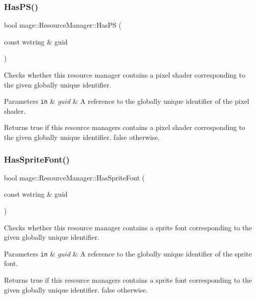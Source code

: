 \subsubsection{\texorpdfstring{Has\+P\+S()}{HasPS()}}
{\footnotesize\ttfamily bool mage\+::\+Resource\+Manager\+::\+Has\+PS (\begin{DoxyParamCaption}\item[{const wstring \&}]{guid }\end{DoxyParamCaption})\hspace{0.3cm}{\ttfamily [noexcept]}}

Checks whether this resource manager contains a pixel shader corresponding to the given globally unique identifier.


\begin{DoxyParams}[1]{Parameters}
\mbox{\tt in}  & {\em guid} & A reference to the globally unique identifier of the pixel shader. \\
\hline
\end{DoxyParams}
\begin{DoxyReturn}{Returns}
{\ttfamily true} if this resource managers contains a pixel shader corresponding to the given globally unique identifier. {\ttfamily false} otherwise. 
\end{DoxyReturn}
\hypertarget{classmage_1_1_resource_manager_a505a5b25923d88020d85a2f3307e4b7f}{}\label{classmage_1_1_resource_manager_a505a5b25923d88020d85a2f3307e4b7f} 
\subsubsection{\texorpdfstring{Has\+Sprite\+Font()}{HasSpriteFont()}}
{\footnotesize\ttfamily bool mage\+::\+Resource\+Manager\+::\+Has\+Sprite\+Font (\begin{DoxyParamCaption}\item[{const wstring \&}]{guid }\end{DoxyParamCaption})\hspace{0.3cm}{\ttfamily [noexcept]}}

Checks whether this resource manager contains a sprite font corresponding to the given globally unique identifier.


\begin{DoxyParams}[1]{Parameters}
\mbox{\tt in}  & {\em guid} & A reference to the globally unique identifier of the sprite font. \\
\hline
\end{DoxyParams}
\begin{DoxyReturn}{Returns}
{\ttfamily true} if this resource managers contains a sprite font corresponding to the given globally unique identifier. {\ttfamily false} otherwise. 
\end{DoxyReturn}
\hypertarget{classmage_1_1_resource_manager_a617768fb9ec0c7c8f00b3f34c6386dfa}{}\label{classmage_1_1_resource_manager_a617768fb9ec0c7c8f00b3f34c6386dfa} 
